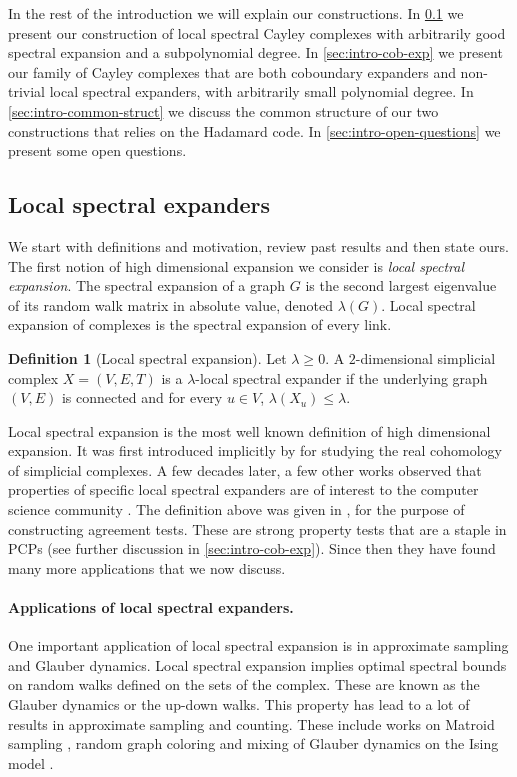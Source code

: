 \documentclass[10pt,a4paper]{article}
\newcommand{\prettyref}[1]{\cref{#1}}
\theoremstyle{definition}
\newtheorem{definition}[theorem]{Definition}
\theoremstyle{remark}
\renewcommand{\leq}{\leqslant}
\renewcommand{\geq}{\geqslant}
\numberwithin{equation}{section}
\let\origparagraph\paragraph
\renewcommand{\paragraph}[1]{\origparagraph{#1.}}
\let\pref=\prettyref
\begin{document}
In the rest of the introduction we will explain our constructions. In \pref{sec:intro-spec-exp} we present our construction of local spectral Cayley complexes with arbitrarily good spectral expansion and a subpolynomial degree. In \pref{sec:intro-cob-exp} we present our family of Cayley complexes that are both coboundary expanders and non-trivial local spectral expanders, with arbitrarily small polynomial degree. In \pref{sec:intro-common-struct} we discuss the common structure of our two constructions that relies on the Hadamard code. In \pref{sec:intro-open-questions} we present some open questions.


\subsection{Local spectral expanders} \label{sec:intro-spec-exp}
%
We start with definitions and motivation, review past results and then state ours. The first notion of high dimensional expansion we consider is \emph{local spectral expansion}. The spectral expansion of a graph \(G\) is the second largest eigenvalue of its random walk matrix in absolute value, denoted \(\lambda(G)\). Local spectral expansion of complexes is the spectral expansion of every link.

\begin{definition}[Local spectral expansion]
    Let \(\lambda \geq 0\). A \(2\)-dimensional simplicial complex \(X=(V,E,T)\) is a \(\lambda\)-local spectral expander if the underlying graph $(V,E)$ is connected and for every \(u \in V\), \(\lambda(X_u) \leq \lambda\). 
\end{definition}
Local spectral expansion is the most well known definition of high dimensional expansion. It was first introduced implicitly by \cite{Garland1973} for studying the real cohomology of simplicial complexes. A few decades later, a few other works observed that properties of specific local spectral expanders are of interest to the computer science community \cite{LubotzkySV2005,KaufmanKL2016,KaufmanM2017}. The definition above was given in \cite{DinurK2017}, for the purpose of constructing agreement tests. These are strong property tests that are a staple in PCPs (see further discussion in \pref{sec:intro-cob-exp}). Since then they have found many more applications that we now discuss.

\paragraph{Applications of local spectral expanders} One important application of local spectral expansion is in approximate sampling and Glauber dynamics. Local spectral expansion implies optimal spectral bounds on random walks defined on the sets of the complex. These are known as the Glauber dynamics or the up-down walks. This property has lead to a lot of results in approximate sampling and counting. These include works on Matroid sampling \cite{AnariLOV2019}, random graph coloring \cite{chen2021rapid} and mixing of Glauber dynamics on the Ising model \cite{AnariJKPV2021}. 
\end{document}
